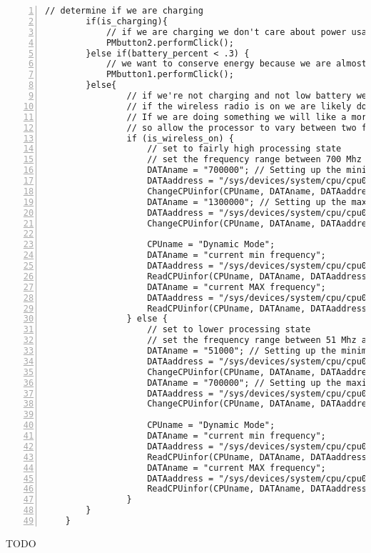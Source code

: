\documentclass{article}	%
\begin{document}
\begin{lstlisting}[float=*,caption={Dynamic Frequency Scaling Mode II (continued)},label={lst:DFS_2_2},numbers=left]
// determine if we are charging
		if(is_charging){
			// if we are charging we don't care about power usage.... set to high performance mode
			PMbutton2.performClick();
		}else if(battery_percent < .3) {
			// we want to conserve energy because we are almost out of it, set to low performance mode
			PMbutton1.performClick();
		}else{
				// if we're not charging and not low battery we have some decisions to make
				// if the wireless radio is on we are likely doing something online.
				// If we are doing something we will like a more responsive device
				// so allow the processor to vary between two fairly high frequency states
				if (is_wireless_on) {
					// set to fairly high processing state
					// set the frequency range between 700 Mhz and 1.3 Ghz
					DATAname = "700000"; // Setting up the minimum frequency 51 Mhz
					DATAaddress = "/sys/devices/system/cpu/cpu0/cpufreq/scaling_min_freq";
					ChangeCPUinfor(CPUname, DATAname, DATAaddress);
					DATAname = "1300000"; // Setting up the maximum frequency at 1300 MHz
					DATAaddress = "/sys/devices/system/cpu/cpu0/cpufreq/scaling_max_freq";
					ChangeCPUinfor(CPUname, DATAname, DATAaddress);

					CPUname = "Dynamic Mode";
					DATAname = "current min frequency";
					DATAaddress = "/sys/devices/system/cpu/cpu0/cpufreq/scaling_min_freq";
					ReadCPUinfor(CPUname, DATAname, DATAaddress);
					DATAname = "current MAX frequency";
					DATAaddress = "/sys/devices/system/cpu/cpu0/cpufreq/scaling_max_freq";
					ReadCPUinfor(CPUname, DATAname, DATAaddress);
				} else {
					// set to lower processing state
					// set the frequency range between 51 Mhz and 700 Mhz
					DATAname = "51000"; // Setting up the minimum frequency 51 Mhz
					DATAaddress = "/sys/devices/system/cpu/cpu0/cpufreq/scaling_min_freq";
					ChangeCPUinfor(CPUname, DATAname, DATAaddress);
					DATAname = "700000"; // Setting up the maximum frequency at 1300 MHz
					DATAaddress = "/sys/devices/system/cpu/cpu0/cpufreq/scaling_max_freq";
					ChangeCPUinfor(CPUname, DATAname, DATAaddress);

					CPUname = "Dynamic Mode";
					DATAname = "current min frequency";
					DATAaddress = "/sys/devices/system/cpu/cpu0/cpufreq/scaling_min_freq";
					ReadCPUinfor(CPUname, DATAname, DATAaddress);
					DATAname = "current MAX frequency";
					DATAaddress = "/sys/devices/system/cpu/cpu0/cpufreq/scaling_max_freq";
					ReadCPUinfor(CPUname, DATAname, DATAaddress);
				}
		}
	}
\end{lstlisting}
TODO
\end{document}
